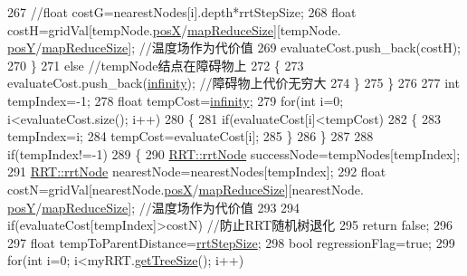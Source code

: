 \begin{DoxyCode}
267                 \textcolor{comment}{//float costG=nearestNodes[i].depth*rrtStepSize;}
268                 \textcolor{keywordtype}{float} costH=gridVal[tempNode.\hyperlink{structRRT_1_1rrtNode_a4c2096fa1d719cf2aa49cf21916a5a4b}{posX}/\hyperlink{rrt_8h_afb8b6147953aaf9e7089f5f157d5b020}{mapReduceSize}][tempNode.
      \hyperlink{structRRT_1_1rrtNode_a219cf78a0f5689bc84744df52c37e84d}{posY}/\hyperlink{rrt_8h_afb8b6147953aaf9e7089f5f157d5b020}{mapReduceSize}];  \textcolor{comment}{//温度场作为代价值}
269                 evaluateCost.push\_back(costH);
270             \}
271             \textcolor{keywordflow}{else}  \textcolor{comment}{//tempNode结点在障碍物上}
272             \{
273                 evaluateCost.push\_back(\hyperlink{rrt_8h_a8bb5664c6d1d0848c059844294c05988}{infinity});  \textcolor{comment}{//障碍物上代价无穷大}
274             \}
275         \}
276 
277         \textcolor{keywordtype}{int} tempIndex=-1;
278         \textcolor{keywordtype}{float} tempCost=\hyperlink{rrt_8h_a8bb5664c6d1d0848c059844294c05988}{infinity};
279         \textcolor{keywordflow}{for}(\textcolor{keywordtype}{int} i=0; i<evaluateCost.size(); i++)
280         \{
281             \textcolor{keywordflow}{if}(evaluateCost[i]<tempCost)
282             \{
283                 tempIndex=i;
284                 tempCost=evaluateCost[i];
285             \}
286         \}
287 
288         \textcolor{keywordflow}{if}(tempIndex!=-1)
289         \{
290             \hyperlink{structRRT_1_1rrtNode}{RRT::rrtNode} successNode=tempNodes[tempIndex];
291             \hyperlink{structRRT_1_1rrtNode}{RRT::rrtNode} nearestNode=nearestNodes[tempIndex];
292             \textcolor{keywordtype}{float} costN=gridVal[nearestNode.\hyperlink{structRRT_1_1rrtNode_a4c2096fa1d719cf2aa49cf21916a5a4b}{posX}/\hyperlink{rrt_8h_afb8b6147953aaf9e7089f5f157d5b020}{mapReduceSize}][nearestNode.
      \hyperlink{structRRT_1_1rrtNode_a219cf78a0f5689bc84744df52c37e84d}{posY}/\hyperlink{rrt_8h_afb8b6147953aaf9e7089f5f157d5b020}{mapReduceSize}];  \textcolor{comment}{//温度场作为代价值}
293             
294             \textcolor{keywordflow}{if}(evaluateCost[tempIndex]>costN)  \textcolor{comment}{//防止RRT随机树退化}
295                 \textcolor{keywordflow}{return} \textcolor{keyword}{false};
296             
297             \textcolor{keywordtype}{float} tempToParentDistance=\hyperlink{rrt_8h_aaac2d108c57a5722b9d816baaed80945}{rrtStepSize};
298             \textcolor{keywordtype}{bool} regressionFlag=\textcolor{keyword}{true};
299             \textcolor{keywordflow}{for}(\textcolor{keywordtype}{int} i=0; i<myRRT.\hyperlink{classRRT_a05dc852e0b777042e290dcc96bf605bb}{getTreeSize}(); i++)

\end{DoxyCode}
